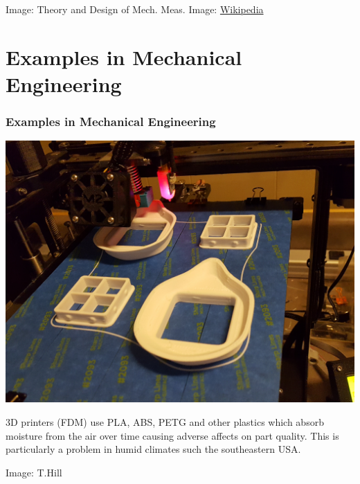\documentclass[fleqn]{beamer} %
\newcommand{\sectiontitleIV}{Examples in Mechanical Engineering }
\begin{document}
\begin{frame}
{\tiny Image: Theory and Design of Mech. Meas. \hspace{20mm} Image: \href{https://en.wikipedia.org/wiki/Thermocouple}{Wikipedia} }
\end{frame}

\section{\sectiontitleIV}

\begin{frame}[label=sectionIV]
\frametitle{\sectiontitleIV}

\begin{multicols}{2}
\includegraphics[scale=0.04]{makethemask.jpg}

\small
3D printers (FDM) use PLA, ABS, PETG and other plastics which absorb moisture from the air over time causing adverse affects on part quality. This is particularly a problem in humid climates such the southeastern USA.
\end{multicols}

{\tiny Image: T.Hill}

\end{frame}
\end{document}
